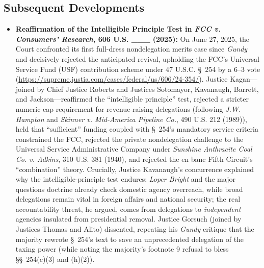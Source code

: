 \documentclass[12pt]{article}
\begin{document}
\subsection{Subsequent Developments}

\begin{itemize}

\item \textbf{Reaffirmation of the Intelligible Principle Test in \textit{FCC v. Consumers' Research}, 606 U.S. \_\_\_ (2025):} On June 27, 2025, the Court confronted its first full-dress nondelegation merits case since \textit{Gundy} and decisively rejected the anticipated revival, upholding the FCC's Universal Service Fund (USF) contribution scheme under 47 U.S.C. \S~254 by a 6--3 vote (\url{https://supreme.justia.com/cases/federal/us/606/24-354/}). Justice Kagan---joined by Chief Justice Roberts and Justices Sotomayor, Kavanaugh, Barrett, and Jackson---reaffirmed the ``intelligible principle'' test, rejected a stricter numeric-cap requirement for revenue-raising delegations (following \textit{J.W. Hampton} and \textit{Skinner v. Mid-America Pipeline Co.}, 490 U.S. 212 (1989)), held that ``sufficient'' funding coupled with \S~254's mandatory service criteria constrained the FCC, rejected the private nondelegation challenge to the Universal Service Administrative Company under \textit{Sunshine Anthracite Coal Co. v. Adkins}, 310 U.S. 381 (1940), and rejected the en banc Fifth Circuit's ``combination'' theory. Crucially, Justice Kavanaugh's concurrence explained why the intelligible-principle test endures: \textit{Loper Bright} and the major questions doctrine already check domestic agency overreach, while broad delegations remain vital in foreign affairs and national security; the real accountability threat, he argued, comes from delegations to \textit{independent} agencies insulated from presidential removal. Justice Gorsuch (joined by Justices Thomas and Alito) dissented, repeating his \textit{Gundy} critique that the majority rewrote \S~254's text to save an unprecedented delegation of the taxing power (while noting the majority's footnote 9 refusal to bless \S\S~254(c)(3) and (h)(2)).

\end{itemize}
\end{document}

